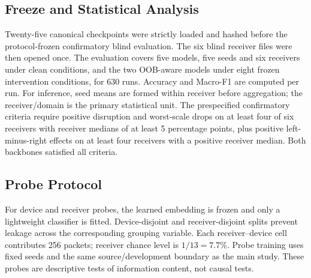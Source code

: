 \subsection{Freeze and Statistical Analysis}
Twenty-five canonical checkpoints were strictly loaded and hashed before the protocol-frozen confirmatory blind evaluation. The six blind receiver files were then opened once. The evaluation covers five models, five seeds and six receivers under clean conditions, and the two OOB-aware models under eight frozen intervention conditions, for 630 runs. Accuracy and Macro-F1 are computed per run. For inference, seed means are formed within receiver before aggregation; the receiver/domain is the primary statistical unit. The prespecified confirmatory criteria require positive disruption and worst-scale drops on at least four of six receivers with receiver medians of at least 5 percentage points, plus positive left-minus-right effects on at least four receivers with a positive receiver median. Both backbones satisfied all criteria.

\subsection{Probe Protocol}
For device and receiver probes, the learned embedding is frozen and only a lightweight classifier is fitted. Device-disjoint and receiver-disjoint splits prevent leakage across the corresponding grouping variable. Each receiver--device cell contributes 256 packets; receiver chance level is $1/13=7.7\%$. Probe training uses fixed seeds and the same source/development boundary as the main study. These probes are descriptive tests of information content, not causal tests.
